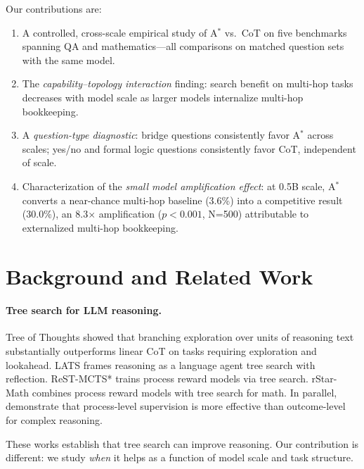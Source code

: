\documentclass{article}
\newcommand{\astar}{A$^*$\xspace}
\begin{document}
Our contributions are:
\begin{enumerate}[leftmargin=*, noitemsep]
  \item A controlled, cross-scale empirical study of \astar vs.\ CoT on five benchmarks spanning QA and mathematics---all comparisons on matched question sets with the same model.
  \item The \emph{capability--topology interaction} finding: search benefit on multi-hop tasks decreases with model scale as larger models internalize multi-hop bookkeeping.
  \item A \emph{question-type diagnostic}: bridge questions consistently favor \astar across scales; yes/no and formal logic questions consistently favor CoT, independent of scale.
  \item Characterization of the \emph{small model amplification effect}: at 0.5B scale, \astar converts a near-chance multi-hop baseline (3.6\%) into a competitive result (30.0\%), an 8.3$\times$ amplification ($p<0.001$, N=500) attributable to externalized multi-hop bookkeeping.
\end{enumerate}

\section{Background and Related Work}
\label{sec:related}

\paragraph{Tree search for LLM reasoning.}
Tree of Thoughts \citep{yao2023treethoughtsdeliberateproblem} showed that branching exploration over units of reasoning text substantially outperforms linear CoT on tasks requiring exploration and lookahead. LATS \citep{zhou2024languageagenttreesearch} frames reasoning as a language agent tree search with reflection. ReST-MCTS* \citep{zhang2024accessinggpt4levelmathematical} trains process reward models via tree search. rStar-Math \citep{guan2025rstarmathsmallllmsmaster} combines process reward models with tree search for math. In parallel, \citet{lightman2023letsverifystepstep} demonstrate that process-level supervision is more effective than outcome-level for complex reasoning.

These works establish that tree search can improve reasoning. Our contribution is different: we study \emph{when} it helps as a function of model scale and task structure.
\end{document}
